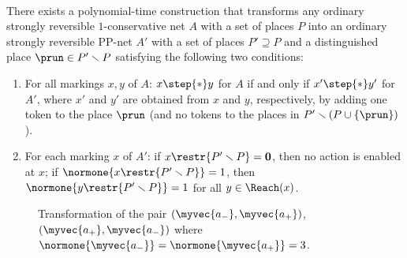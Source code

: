 \begin{prop}\label{prop:constoPP}
\hfill\\	
There exists a polynomial-time construction that transforms
any ordinary strongly reversible $1$-conservative net $A$ with a
set of places $P$ 
into an ordinary strongly reversible PP-net $A'$ with a
	set of places $P'\supseteq P$ and a distinguished place
	$\prun\in P'\smallsetminus P$ satisfying the following two
	conditions:
\begin{enumerate}
	\item		
For all markings $x,y$ of $A$:
		$x \step{*} y$ for $A$ if and only if $x' \step{*} y'$ for
		$A'$, where $x'$ and $y'$ are obtained from $x$ and $y$,
		respectively, by
		adding one token to the place $\prun$ (and no tokens to the
		places in $P'\smallsetminus (P\cup\{\prun\})$).
    \item
For each marking $x$ of $A'$:
		if $x\restr{P'\smallsetminus P}=\mathbf{0}$, then no
		action is enabled at $x$; if 
		$\normone{x\restr{P'\smallsetminus P}}=1$, then  
		$\normone{y\restr{P'\smallsetminus P}}=1$ for all
		$y\in\Reach(x)$.
\end{enumerate}
\end{prop}
\begin{figure}
\begin{center}

\caption{Transformation of the pair
$(\myvec{a_-},\myvec{a_+})$, $(\myvec{a_+},\myvec{a_-})$  where $\normone{\myvec{a_-}}
    = \normone{\myvec{a_+}} = 3$.}
\label{fig:contopp1}
\end{center}
\end{figure}

